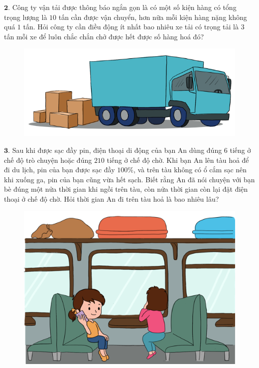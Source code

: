 \begin{multicols}{2}
	$\pmb{2.}$ Công ty vận tải được thông báo ngắn gọn là có một số kiện hàng có tổng trọng lượng là $10$ tấn cần được vận chuyển, hơn nữa mỗi kiện hàng nặng không quá $1$ tấn. Hỏi công ty  cần điều động ít nhất bao nhiêu xe tải có trọng tải là $3$ tấn mỗi xe để luôn chắc chắn chở được hết được số hàng hoá đó?
	\begin{figure}[H]
		\centering
		\captionsetup{labelformat= empty, justification=centering}
		\includegraphics[width=1\linewidth]{Pi5_bai2}
		\vspace*{-15pt}
	\end{figure}
	$\pmb{3.}$ Sau khi được sạc đầy pin, điện thoại di động của bạn An dùng đúng $6$ tiếng ở chế độ trò chuyện hoặc đúng $210$ tiếng ở chế độ chờ. Khi bạn An lên tàu hoả để đi du lịch, pin của bạn được sạc đầy $100\%$, và trên tàu không có ổ cắm sạc nên khi xuống ga, pin của bạn cũng vừa hết sạch. Biết rằng An đã nói chuyện với bạn bè đúng một nửa thời gian khi ngồi trên tàu, còn nửa thời gian còn lại đặt điện thoại ở chế độ chờ. Hỏi thời gian An đi trên tàu hoả là bao nhiêu lâu?
	\begin{figure}[H]
		\centering
		\vspace*{-5pt}
		\captionsetup{labelformat= empty, justification=centering}
		\includegraphics[width=1\linewidth]{Pi5_bai3}

\end{figure}
\end{multicols}
